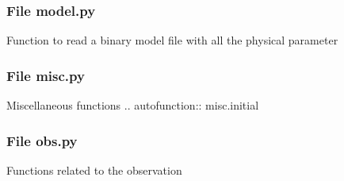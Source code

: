 \documentclass[letterpaper,10pt,english]{sphinxmanual}
\begin{document}
\subsubsection{File model.py}
\label{\detokenize{functions:file-model-py}}
\sphinxAtStartPar
Function to read a binary model file with all the physical parameter

\begin{fulllineitems}
\label{\detokenize{functions:model.read_model}}
\pysigstartsignatures
{}
\pysigstopsignatures
\end{fulllineitems}



\subsubsection{File misc.py}
\label{\detokenize{functions:file-misc-py}}
\sphinxAtStartPar
Miscellaneous functions
.. autofunction:: misc.initial


\subsubsection{File obs.py}
\label{\detokenize{functions:file-obs-py}}
\sphinxAtStartPar
Functions related to the observation

\begin{fulllineitems}
\label{\detokenize{functions:obs.read_profile}}
\pysigstartsignatures
{}
\pysigstopsignatures
\end{fulllineitems}

\end{document}
